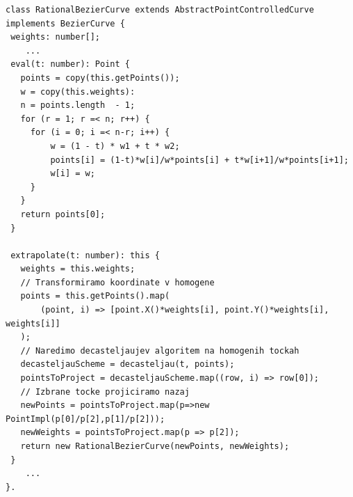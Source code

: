 \documentclass[isrm2, tisk]{fmfdelo}
\begin{document}
    \begin{lstlisting}[label={lst:rat-curve}]
class RationalBezierCurve extends AbstractPointControlledCurve implements BezierCurve {
 weights: number[];
    ...
 eval(t: number): Point {
   points = copy(this.getPoints());
   w = copy(this.weights):
   n = points.length  - 1;
   for (r = 1; r =< n; r++) {
     for (i = 0; i =< n-r; i++) {
         w = (1 - t) * w1 + t * w2;
         points[i] = (1-t)*w[i]/w*points[i] + t*w[i+1]/w*points[i+1];
         w[i] = w;
     }
   }
   return points[0];
 }

 extrapolate(t: number): this {
   weights = this.weights;
   // Transformiramo koordinate v homogene
   points = this.getPoints().map(
       (point, i) => [point.X()*weights[i], point.Y()*weights[i], weights[i]]
   );
   // Naredimo decasteljaujev algoritem na homogenih tockah
   decasteljauScheme = decasteljau(t, points);
   pointsToProject = decasteljauScheme.map((row, i) => row[0]);
   // Izbrane tocke projiciramo nazaj
   newPoints = pointsToProject.map(p=>new PointImpl(p[0]/p[2],p[1]/p[2]));
   newWeights = pointsToProject.map(p => p[2]);
   return new RationalBezierCurve(newPoints, newWeights);
 }
    ...
}.
    \end{lstlisting}
\end{document}
